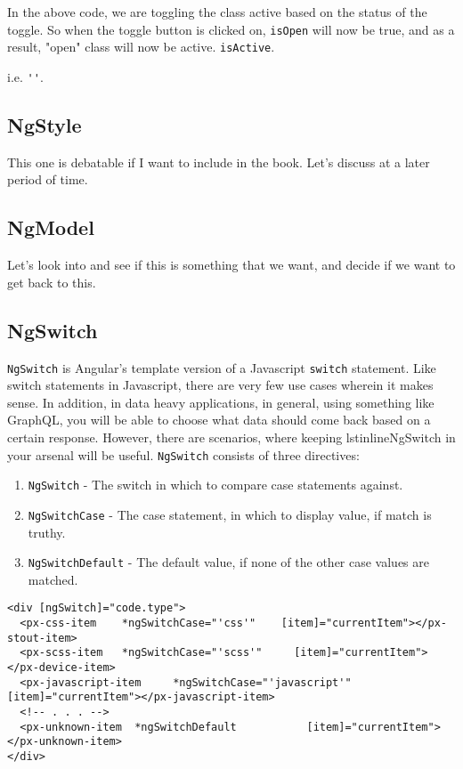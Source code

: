 In the above code, we are toggling the class active based on the status of 
the toggle. So when the toggle button is clicked on, \lstinline{isOpen} will 
now be true, and as a result, "open" class will now be active. 
\lstinline{isActive}. 

 i.e. \lstinline{''}. 

 \subsection{ NgStyle }
This one is debatable if I want to include in the book. Let's discuss at a
later period of time. 

\subsection{ NgModel }
Let's look into and see if this is something that we want, and decide if we 
want to get back to this. 

\subsection{ NgSwitch }
\lstinline{NgSwitch} is Angular's template version of a Javascript 
\lstinline{switch} statement. Like switch statements in Javascript, there are 
very few use cases wherein it makes sense. In addition, in data heavy 
applications, in general, using something like GraphQL, you will be able to 
choose what data should come back based on a certain response. However, there 
are scenarios, where keeping lstinline{NgSwitch} in your arsenal will be 
useful. \lstinline{NgSwitch} consists of three directives: 
\begin{enumerate}
  \item \lstinline{NgSwitch} - The switch in which to compare case statements against. 
  \item \lstinline{NgSwitchCase} - The case statement, in which to display 
  value, if match is truthy. 
  \item \lstinline{NgSwitchDefault} - The default value, if none of the other
  case values are matched. 
\end{enumerate}

\begin{lstlisting}
<div [ngSwitch]="code.type">
  <px-css-item    *ngSwitchCase="'css'"    [item]="currentItem"></px-stout-item>
  <px-scss-item   *ngSwitchCase="'scss'"     [item]="currentItem"></px-device-item>
  <px-javascript-item     *ngSwitchCase="'javascript'"  [item]="currentItem"></px-javascript-item>
  <!-- . . . -->
  <px-unknown-item  *ngSwitchDefault           [item]="currentItem"></px-unknown-item>
</div>
\end{lstlisting}

